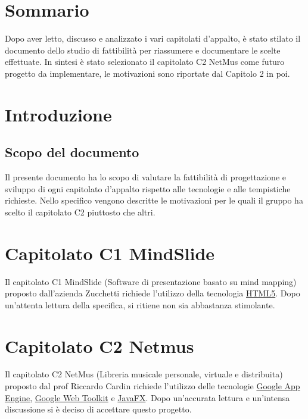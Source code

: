 \tableofcontents
\thispagestyle{fancy} %


\chapter*{Sommario}
\thispagestyle{fancy} %
Dopo aver letto, discusso e analizzato i vari capitolati d'appalto, \`e
stato stilato il documento dello studio di fattibilit\`a per riassumere e
documentare le scelte effettuate. In sintesi \`e stato selezionato il capitolato
C2 NetMus come futuro progetto da implementare, le motivazioni sono riportate dal
Capitolo 2 in poi.


\chapter{Introduzione}
\thispagestyle{fancy} %

\section{Scopo del documento}
Il presente documento ha lo scopo di valutare la fattibilit\`a di progettazione
e sviluppo di ogni capitolato d'appalto rispetto alle tecnologie e alle tempistiche richieste. Nello specifico vengono descritte le motivazioni per le quali il gruppo ha scelto il capitolato C2 piuttosto che altri.




\chapter{Capitolato C1 MindSlide}
\thispagestyle{fancy}
Il capitolato C1 MindSlide (Software di presentazione basato su mind mapping)
proposto dall'azienda Zucchetti richiede l'utilizzo della tecnologia
\underline{HTML5}. Dopo un'attenta lettura della specifica, si ritiene non
sia abbastanza stimolante.

\chapter{Capitolato C2 Netmus}
\thispagestyle{fancy}
Il capitolato C2 NetMus (Libreria musicale personale, virtuale e distribuita)
proposto dal prof Riccardo Cardin richiede l'utilizzo delle tecnologie \underline{Google
App Engine}, \underline{Google Web Toolkit} e \underline{JavaFX}. Dopo
un'accurata lettura e un'intensa discussione si \`e deciso di accettare questo progetto.
